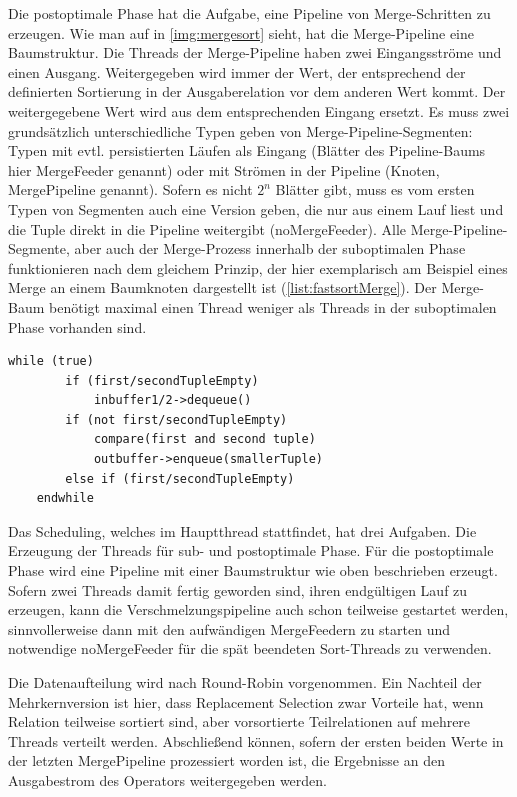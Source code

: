 \documentclass[a4paper,12pt,twoside]{article}
\begin{document}
Die postoptimale Phase hat die Aufgabe, eine Pipeline von Merge-Schritten zu erzeugen. Wie man auf in \autoref{img:mergesort} sieht, hat die Merge-Pipeline eine Baumstruktur. Die Threads der Merge-Pipeline haben zwei Eingangsströme und einen Ausgang. Weitergegeben wird immer der Wert, der entsprechend der definierten Sortierung in der Ausgaberelation vor dem anderen Wert kommt. Der weitergegebene Wert wird aus dem entsprechenden Eingang ersetzt. Es muss zwei grundsätzlich unterschiedliche Typen geben von Merge-Pipeline-Segmenten: Typen mit evtl. persistierten Läufen als Eingang (Blätter des Pipeline-Baums hier MergeFeeder genannt) oder mit Strömen in der Pipeline (Knoten, MergePipeline genannt). Sofern es nicht $2^n$ Blätter gibt, muss es vom ersten Typen von Segmenten auch eine Version geben, die nur aus einem Lauf liest und die Tuple direkt in die Pipeline weitergibt (noMergeFeeder). Alle Merge-Pipeline-Segmente, aber auch der Merge-Prozess innerhalb der suboptimalen Phase funktionieren nach dem gleichem Prinzip, der hier exemplarisch am Beispiel eines Merge an einem Baumknoten dargestellt ist (\autoref{list:fastsortMerge}). Der Merge-Baum benötigt maximal einen Thread weniger als Threads in der suboptimalen Phase vorhanden sind.

\begin{minipage}{\linewidth}
	\begin{lstlisting}[caption={Fastsort: Merge in Pipeline}, label=list:fastsortMerge] 
	while (true)
		if (first/secondTupleEmpty)
			inbuffer1/2->dequeue()
		if (not first/secondTupleEmpty)
			compare(first and second tuple)
			outbuffer->enqueue(smallerTuple)
		else if (first/secondTupleEmpty)
	endwhile
	\end{lstlisting}
\end{minipage}

Das Scheduling, welches im Hauptthread stattfindet, hat drei Aufgaben. Die Erzeugung der Threads für sub- und postoptimale Phase. Für die postoptimale Phase wird eine Pipeline mit einer Baumstruktur wie oben beschrieben erzeugt. Sofern zwei Threads damit fertig geworden sind, ihren endgültigen Lauf zu erzeugen, kann die Verschmelzungspipeline auch schon teilweise gestartet werden, sinnvollerweise dann mit den aufwändigen MergeFeedern zu starten und notwendige noMergeFeeder für die spät beendeten Sort-Threads zu verwenden.

Die Datenaufteilung wird nach Round-Robin vorgenommen. Ein Nachteil der Mehrkernversion ist hier, dass Replacement Selection zwar Vorteile hat, wenn Relation teilweise sortiert sind, aber vorsortierte Teilrelationen auf mehrere Threads verteilt werden. Abschließend können, sofern der ersten beiden Werte in der letzten MergePipeline prozessiert worden ist, die Ergebnisse an den Ausgabestrom des Operators weitergegeben werden.
\end{document}
